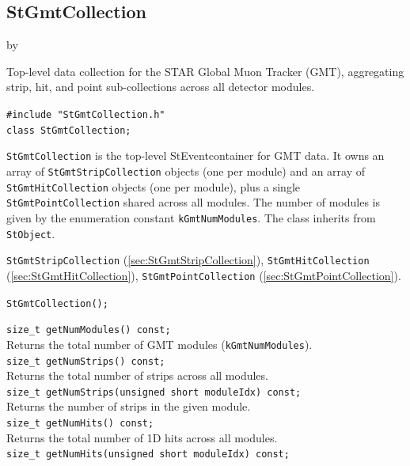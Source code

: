\documentclass[twoside]{article}
\newcommand{\StEvent}{\textsf{StEvent}}
\newcommand{\entrylabel}[1]{\mbox{\textbf{{#1}}}\hfil}%
\newenvironment{entry}
{\begin{list}{}%
    {\renewcommand{\makelabel}{\entrylabel}%
     \setlength{\labelwidth}{90pt}%
     \setlength{\leftmargin}{\labelwidth}
     \advance\leftmargin by \labelsep%
      }%
    }%
  {\end{list}}
\newcommand{\Entrylabel}[1]%
{\raisebox{0pt}[1ex][0pt]{\makebox[\labelwidth][l]%
    {\parbox[t]{\labelwidth}{\hspace{0pt}\textbf{{#1}}}}}}
\newenvironment{Entry}%
{\renewcommand{\entrylabel}{\Entrylabel}\begin{entry}}%
  {\end{entry}}
\begin{document}
\subsection{StGmtCollection}
\label{sec:StGmtCollection}
\begin{Entry}
\item[Summary] Top-level data collection for the STAR Global Muon Tracker (GMT),
    aggregating strip, hit, and point sub-collections across all detector modules.
\item[Synopsis]
    \verb+#include "StGmtCollection.h"+\\
    \verb+class StGmtCollection;+\\
\item[Description]
    \texttt{StGmtCollection} is the top-level \StEvent container for GMT data.
    It owns an array of \texttt{StGmtStripCollection} objects (one per module)
    and an array of \texttt{StGmtHitCollection} objects (one per module), plus
    a single \texttt{StGmtPointCollection} shared across all modules.
    The number of modules is given by the enumeration constant
    \texttt{kGmtNumModules}.  The class inherits from \texttt{StObject}.
\item[Related Classes]
    \texttt{StGmtStripCollection} (\ref{sec:StGmtStripCollection}),
    \texttt{StGmtHitCollection} (\ref{sec:StGmtHitCollection}),
    \texttt{StGmtPointCollection} (\ref{sec:StGmtPointCollection}).
\item[Public\\ Constructors]
    \verb+StGmtCollection();+\\
\item[Public Member\\ Functions]
    \verb+size_t getNumModules() const;+\\
    Returns the total number of GMT modules (\texttt{kGmtNumModules}).\\
    \verb+size_t getNumStrips() const;+\\
    Returns the total number of strips across all modules.\\
    \verb+size_t getNumStrips(unsigned short moduleIdx) const;+\\
    Returns the number of strips in the given module.\\
    \verb+size_t getNumHits() const;+\\
    Returns the total number of 1D hits across all modules.\\
    \verb+size_t getNumHits(unsigned short moduleIdx) const;+\\

\end{Entry}
\end{document}
